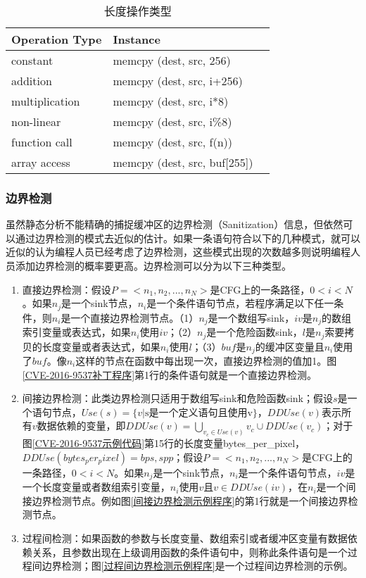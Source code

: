 {\begin{table}[ht]
\begin{center}
\caption{长度操作类型} \label{LENGTH_TYPE}
\begin{small}
\begin{tabular}{lll}
\hline
{\bf Operation Type } & {\bf Instance}\\ \hline
constant & memcpy (dest, src, 256) \\ \hline
addition & memcpy (dest, src, i+256) \\ \hline
multiplication & memcpy (dest, src, i*8) \\ \hline
non-linear & memcpy (dest, src, i\%8) \\ \hline
function call & memcpy (dest, src, f(n)) \\ \hline
array access & memcpy (dest, src, buf[255]) \\ \hline
\end{tabular}
\end{small}
\end{center}
\end{table}

\subsubsection{边界检测}

虽然静态分析不能精确的捕捉缓冲区的边界检测（Sanitization）信息，但依然可以通过边界检测的模式去近似的估计。如果一条语句符合以下的几种模式，就可以近似的认为编程人员已经考虑了边界检测，这些模式出现的次数越多则说明编程人员添加边界检测的概率要更高。边界检测可以分为以下三种类型。

\begin{enumerate}[1]
\item 直接边界检测：假设$P=<n_1, n_2,...,n_N>$是CFG上的一条路径，$0<i<N$。如果$n_j$是一个sink节点，$n_i$是一个条件语句节点，若程序满足以下任一条件，则$n_i$是一个直接边界检测节点。（1）$n_j$是一个数组写sink，$iv$是$n_j$的数组索引变量或表达式，如果$n_i$使用$iv$；（2）$n_j$是一个危险函数sink，$l$是$n_j$索要拷贝的长度变量或者表达式，如果$n_i$使用$l$；（3）$buf$是$n_j$的缓冲区变量且$n_i$使用了$buf$。像$n_i$这样的节点在函数中每出现一次，直接边界检测的值加1。图\ref{CVE-2016-9537补丁程序}第1行的条件语句就是一个直接边界检测。
\item 间接边界检测：此类边界检测只适用于数组写sink和危险函数sink；假设$s$是一个语句节点，$Use(s)=\{v|\text{s是一个定义语句且使用v}\}$，$DDUse(v)$表示所有$v$数据依赖的变量，即$DDUse(v) = \bigcup_{v_c \in Use(v)} v_c \cup DDUse(v_c)$；对于图\ref{CVE-2016-9537示例代码}第15行的长度变量{bytes\_per\_pixel}，$DDUse(bytes_per_pixel) = {bps, spp}$；假设$P=<n_1, n_2,...,n_N>$是CFG上的一条路径，$0<i<N$。如果$n_j$是一个sink节点，$n_i$是一个条件语句节点，$iv$是一个长度变量或者数组索引变量，$n_i$使用$v$且$v \in DDUse(iv)$，在$n_i$是一个间接边界检测节点。例如图\ref{间接边界检测示例程序}的第1行就是一个间接边界检测节点。
\item 过程间检测：如果函数的参数与长度变量、数组索引或者缓冲区变量有数据依赖关系，且参数出现在上级调用函数的条件语句中，则称此条件语句是一个过程间边界检测；图\ref{过程间边界检测示例程序}是一个过程间边界检测的示例。
\end{enumerate}

}
